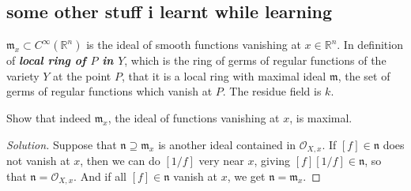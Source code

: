 \subsection{some other stuff i learnt while learning}

\(\mathfrak{m}_x \subset C^\infty(\mathbb{R}^n)\) is the ideal of smooth functions vanishing at \(x \in \mathbb{R}^n\). In \cite{hart} definition of \textit{\textbf{local ring of \(P\) in \(Y\)}}, which is the ring of germs of regular functions of the variety \(Y\) at the point \(P\), that it is a local ring with maximal ideal \(\mathfrak{m}\), the set of germs of regular functions which vanish at \(P\). The residue field is \(k\).

\begin{exercise}\leavevmode
Show that indeed \(\mathfrak{m}_x\), the ideal of functions vanishing at \(x\), is maximal.
\end{exercise}
\begin{proof}[Solution]\leavevmode
	Suppose that \(\mathfrak{n} \supseteq \mathfrak{m}_x\) is another ideal contained in \(\mathcal{O}_{X,x}\). If \([f] \in \mathfrak{n}\) does not vanish at \(x\), then we can do \([1/f]\) very near  \(x\), giving \([f][1/f] \in \mathfrak{n}\), so that \(\mathfrak{n}=\mathcal{O}_{X,x}\). And if all \([f] \in \mathfrak{n}\) vanish at \(x\), we get \(\mathfrak{n}=\mathfrak{m}_x\).
\end{proof}

